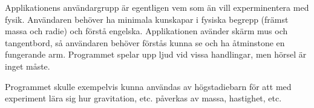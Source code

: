 Applikationens användargrupp är egentligen vem som än vill experminentera
med fysik. Användaren behöver ha minimala kunskapar i fysiska begrepp
(främst massa och radie) och förstå engelska.
Applikationen avänder skärm mus och tangentbord, så användaren behöver
förstås kunna se och ha åtminstone en fungerande arm.
Programmet spelar upp ljud vid vissa handlingar, men hörsel är inget
måste.

Programmet skulle exempelvis kunna användas av högstadiebarn för att med 
experiment lära sig hur gravitation, etc. påverkas
av massa, hastighet, etc.

